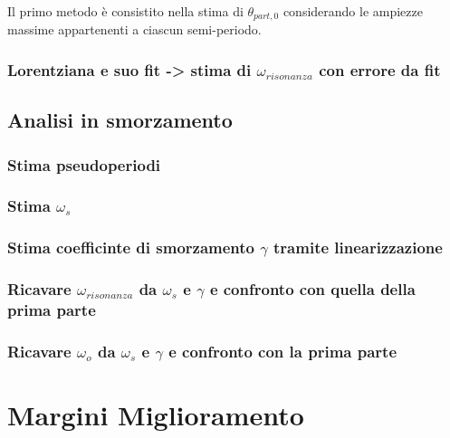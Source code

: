 \documentclass[a4paper,11pt,oneside]{article}
\begin{document}
Il primo metodo è consistito nella stima di $\theta_{part,0}$ considerando le ampiezze massime appartenenti a ciascun semi-periodo.  




\subsubsection{Lorentziana e suo fit -> stima di $\omega_{risonanza}$ con errore da fit}

\subsection{Analisi in smorzamento}
\subsubsection{Stima pseudoperiodi}
\subsubsection{Stima $\omega_s$ }
\subsubsection{Stima coefficinte di smorzamento $\gamma$ tramite linearizzazione}
\subsubsection{Ricavare $\omega_{risonanza}$ da $\omega_s$ e $\gamma$ e confronto con quella della prima parte}
\subsubsection{Ricavare $\omega_o$ da $\omega_s$ e $\gamma$ e confronto con la prima parte}












\section{Margini Miglioramento}
\end{document}
